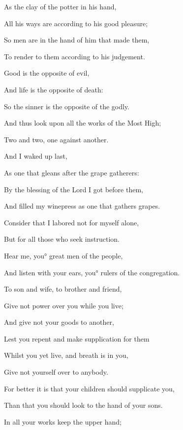 {\par }{\Q {}As the clay of the potter in his hand,
\par }{\Q All his ways are according to his good pleasure;
\par }{\Q So men are in the hand of him that made them,
\par }{\Q To render to them according to his judgement.
\par }{\Q {}Good is the opposite of evil,
\par }{\Q And life is the opposite of death:
\par }{\Q So the sinner is the opposite of the godly.
\par }{\Q {}And thus look upon all the works of the Most High;
\par }{\Q Two and two, one against another.
\par }{\BB \par }{\Q {}And I waked up last,
\par }{\Q As one that gleans after the grape gatherers:
\par }{\Q By the blessing of the Lord I got before them,
\par }{\Q And filled my winepress as one that gathers grapes.
\par }{\Q {}Consider that I labored not for myself alone,
\par }{\Q But for all those who seek instruction.
\par }{\Q {}Hear me, you° great men of the people,
\par }{\Q And listen with your ears, you° rulers of the congregation.
\par }{\BB \par }{\Q {}To son and wife, to brother and friend,
\par }{\Q Give not power over you while you live;
\par }{\Q And give not your goods to another,
\par }{\Q Lest you repent and make supplication for them
{}
\par }{\Q {}Whilst you yet live, and breath is in you,
\par }{\Q Give not yourself over to anybody.
\par }{\Q {}For better it is that your children should supplicate you,
\par }{\Q Than that you should look to the hand of your sons.
\par }{\Q {}In all your works keep the upper hand;
}
